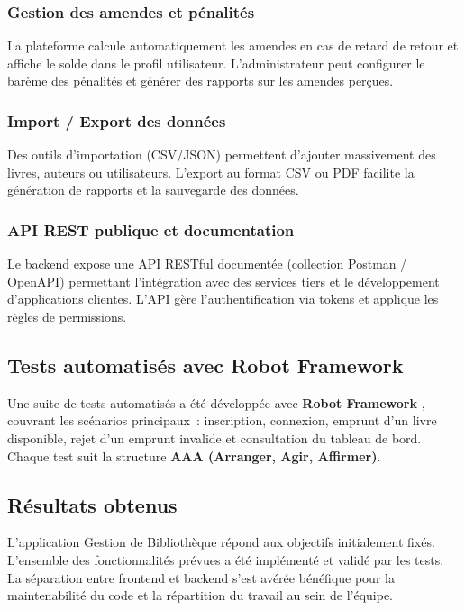 \documentclass{rapportPFA}
\begin{document}
\subsubsection{Gestion des amendes et pénalités}
La plateforme calcule automatiquement les amendes en cas de retard de retour et affiche le solde dans le profil utilisateur. L'administrateur peut configurer le barème des pénalités et générer des rapports sur les amendes perçues.

\subsubsection{Import / Export des données}
Des outils d'importation (CSV/JSON) permettent d'ajouter massivement des livres, auteurs ou utilisateurs. L'export au format CSV ou PDF facilite la génération de rapports et la sauvegarde des données.

\subsubsection{API REST publique et documentation}
Le backend expose une API RESTful documentée (collection Postman / OpenAPI) permettant l'intégration avec des services tiers et le développement d'applications clientes. L'API gère l'authentification via tokens et applique les règles de permissions.

\subsection{Tests automatisés avec Robot Framework}

Une suite de tests automatisés a été développée avec \textbf{Robot Framework}
\cite{robot}, couvrant les scénarios principaux~: inscription, connexion, emprunt d'un
livre disponible, rejet d'un emprunt invalide et consultation du tableau de bord.
Chaque test suit la structure \textbf{AAA (Arranger, Agir, Affirmer)}.

\subsection{Résultats obtenus}

L'application Gestion de Bibliothèque répond aux objectifs initialement fixés. L'ensemble des
fonctionnalités prévues a été implémenté et validé par les tests.
La séparation entre frontend et backend s'est avérée bénéfique pour la
maintenabilité du code et la répartition du travail au sein de l'équipe.
\end{document}
